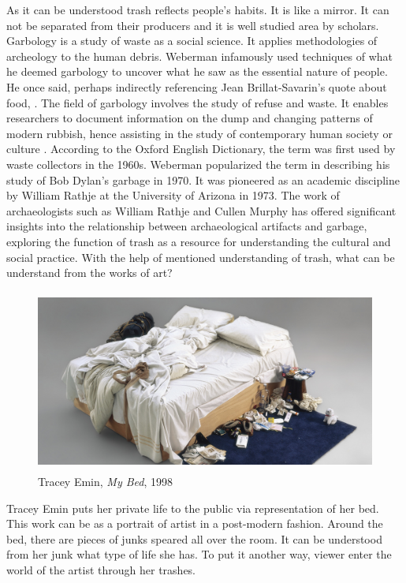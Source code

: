 As it can be understood trash reflects people’s habits. It is like a mirror. It can not be separated from their producers and it is well studied area by scholars. Garbology is a study of waste as a social science. It applies methodologies of archeology to the human debris. Weberman infamously used techniques of what he deemed garbology to uncover what he saw as the essential nature of people. He once said, perhaps indirectly referencing Jean Brillat-Savarin’s quote about food,  \citep[as cited in][301]{lukas2012garbage}. The field of garbology involves the study of refuse and waste. It enables researchers to document information on the dump and changing patterns of modern rubbish, hence assisting in the study of contemporary human society or culture \citep{roy2012garbology}. According to the Oxford English Dictionary, the term was first used by waste collectors in the 1960s. Weberman popularized the term in describing his study of Bob Dylan’s garbage in 1970. It was pioneered as an academic discipline by William Rathje at the University of Arizona in 1973. The work of archaeologists such as William Rathje and Cullen Murphy has offered significant insights into the relationship between archaeological artifacts and garbage, exploring the function of trash as a resource for understanding the cultural and social practice. With the help of mentioned understanding of trash, what can be understand from the works of art?

\begin{figure}[h!]
  \centering
  \includegraphics[height=6cm]{graphics/tracey-emin-my-bed.jpg}
  \caption{Tracey Emin, \textit{My Bed}, 1998}
  \label{fig:TraceyEmin_MyBed}
\end{figure}

Tracey Emin puts her private life to the public via representation of her bed. This work can be as a portrait of artist in a post-modern fashion. Around the bed, there are pieces of junks speared all over the room. It can be understood from her junk what type of life she has. To put it another way, viewer enter the world of the artist through her trashes.

